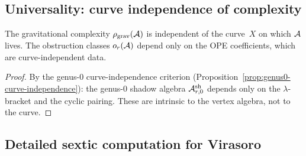 
\subsection{Universality: curve independence of complexity}
\label{subsec:thqg-curve-independence}

\begin{proposition}
\label{prop:thqg-curve-independence}
\ClaimStatusProvedHere
{}
The gravitational complexity $\rho_{\mathrm{grav}}(\mathcal{A})$ is
independent of the curve~$X$ on which $\mathcal{A}$ lives. The
obstruction classes $o_r(\mathcal{A})$ depend only on the OPE
coefficients, which are curve-independent data.
\end{proposition}

\begin{proof}
By the genus-$0$ curve-independence criterion
(Proposition~\ref{prop:genus0-curve-independence}):
the genus-$0$ shadow algebra $\mathcal{A}^{\mathrm{sh}}_{r,0}$
depends only on the $\lambda$-bracket and the cyclic
pairing. These are intrinsic to the vertex algebra,
not to the curve.
\end{proof}



\subsection{Detailed sextic computation for Virasoro}
\label{subsec:thqg-sextic-detail}

